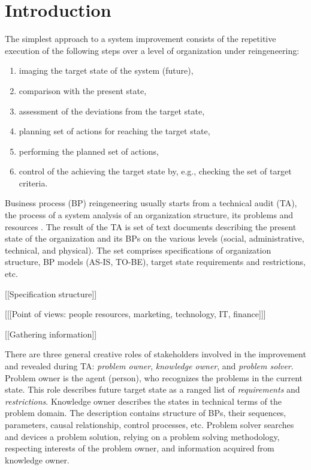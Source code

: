 \documentclass[12pt,a4paper]{llncs}
\begin{document}
\section{Introduction}
\label{sec:intro}

The simplest approach to a system improvement consists of the repetitive execution of the following steps over a level of organization under reingeneering:
\begin{enumerate}
\item imaging the target state of the system (future),
\item comparison with the present state,
\item assessment of the deviations from the target state,
\item planning set of actions for reaching the target state,
\item performing the planned set of actions,
\item control of the achieving the target state by, e.g., checking the set of target criteria.
\end{enumerate}

Business process (BP) reingeneering usually starts from a technical audit (TA), the process of a system analysis of an organization structure, its problems and resources \cite{techaudit}.  The result of the TA is set of text documents describing the present state of the organization and its BPs on the various levels (social, administrative, technical, and physical).  The set comprises specifications of organization structure, BP models (AS-IS, TO-BE), target state requirements and restrictions, etc.

[[Specification structure]]

[[[Point of views: people resources, marketing, technology, IT, finance]]]

[[Gathering information]]

There are three general creative roles of stakeholders involved in the improvement and revealed during TA: \emph{problem owner}, \emph{knowledge owner}, and \emph{problem solver}.  Problem owner is the agent (person), who recognizes the problems in the current state.  This role describes future target state as a ranged list of \emph{requirements} and \emph{restrictions}.  Knowledge owner describes the states in technical terms of the problem domain.  The description contains structure of BPs, their sequences, parameters, causal relationship, control processes, etc.  Problem solver searches and devices a problem solution, relying on a problem solving methodology, respecting interests of the problem owner, and information acquired from knowledge owner.
\end{document}
